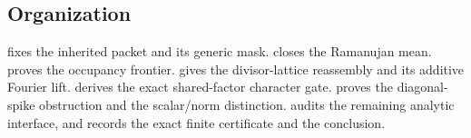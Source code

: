 \subsection{Organization}

 fixes the inherited packet and its generic
mask.   closes the Ramanujan mean.
 proves the occupancy frontier.
 gives the divisor-lattice reassembly and its
additive Fourier lift.   derives the exact
shared-factor character gate.   proves the
diagonal-spike obstruction and the scalar/norm distinction.
 audits the remaining analytic interface,
and  records the exact finite certificate
and the conclusion.
